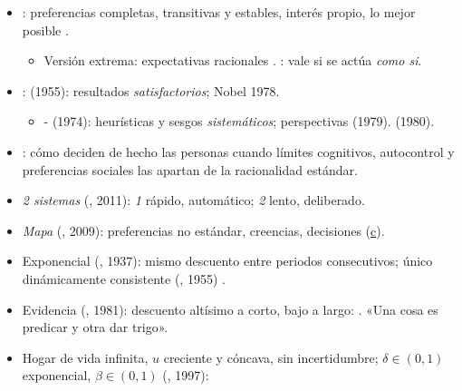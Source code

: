\documentclass{article}
\begin{document}
\begin{columnas}
\begin{itemize}
\item {}: preferencias completas, transitivas y estables, interés propio, lo mejor posible .
  \begin{itemize}
  \item Versión extrema: expectativas racionales . : vale si se actúa \emph{como si}.
  \end{itemize}
\item {}:  (1955): resultados \emph{satisfactorios}; Nobel 1978.
  \begin{itemize}
  \item {}- (1974): heurísticas y sesgos \emph{sistemáticos}; perspectivas (1979).  (1980).
  \end{itemize}
\item {}: cómo deciden de hecho las personas cuando límites cognitivos, autocontrol y preferencias sociales las apartan de la racionalidad estándar.
\item \emph{2 sistemas} (, 2011): \emph{1} rápido, automático; \emph{2} lento, deliberado.
\item \emph{Mapa} (, 2009): preferencias no estándar, creencias, decisiones (\hyperref[rep:III.1]{c}).
\end{itemize}
\begin{itemize}
\item Exponencial (, 1937): mismo descuento entre periodos consecutivos; único dinámicamente consistente (, 1955) .
\item Evidencia (, 1981): descuento altísimo a corto, bajo a largo: . «Una cosa es predicar y otra dar trigo».
\end{itemize}
\begin{itemize}
\item Hogar de vida infinita, $u$ creciente y cóncava, sin incertidumbre; $\delta\in(0,1)$ exponencial, $\beta\in(0,1)$  (, 1997):

\end{itemize}
\end{columnas}
\end{document}
